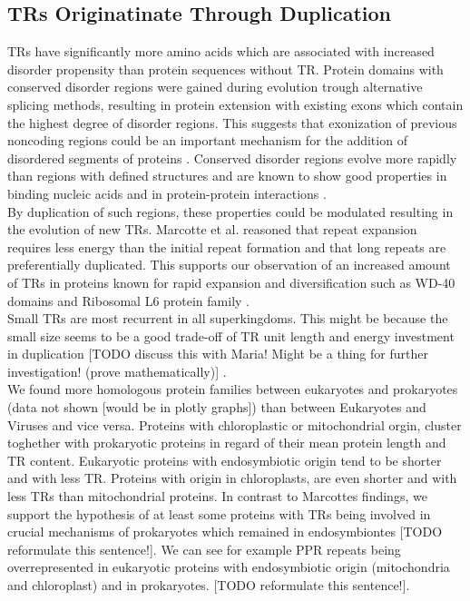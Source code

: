 \documentclass[a4,center,fleqn]{NAR}
\begin{document}
\subsection{TRs Originatinate Through Duplication}
TRs have significantly more amino acids which are associated with increased disorder propensity than protein sequences without TR. 
Protein domains with conserved disorder regions were gained during evolution trough alternative splicing methods, resulting in protein extension with existing exons which contain the highest degree of disorder regions. This suggests that exonization of previous noncoding regions could be an important mechanism for the addition of disordered segments of proteins \cite{Krisentseva2003, Romero2006, Hegyi2011, Buljan2012, Barbosa2012}.
Conserved disorder regions evolve more rapidly than regions with defined structures and are known to show good properties in binding nucleic acids and in protein-protein interactions \cite{Chen2006}. \\
By duplication of such regions, these properties could be modulated resulting in the evolution of new TRs.
Marcotte et al. reasoned that repeat expansion requires less energy than the initial repeat formation and that long repeats are preferentially duplicated. 
This supports our observation of an increased amount of TRs in proteins known for rapid expansion and diversification such as WD-40 domains and Ribosomal L6 protein family \cite{Smith1999, Golden1993}.\\
Small TRs are most recurrent in all superkingdoms. This might be because the small size seems to be a good trade-off of TR unit length and energy investment in duplication [TODO discuss this with Maria! Might be a thing for further investigation! (prove mathematically)] \cite{Andrade2001}.\\
We found more homologous protein families between eukaryotes and prokaryotes (data not shown [would be in plotly graphs]) than between Eukaryotes and Viruses and vice versa. 
Proteins with chloroplastic or mitochondrial orgin, cluster toghether with prokaryotic proteins in regard of their mean protein length and TR content. 
Eukaryotic proteins with endosymbiotic origin tend to be shorter and with less TR. Proteins with origin in chloroplasts, are even shorter and with less TRs than mitochondrial proteins. In contrast to Marcottes \cite{Marcotte1999} findings, we support the hypothesis of at least some proteins with TRs being involved in crucial mechanisms of prokaryotes which remained in endosymbiontes [TODO reformulate this sentence!]. We can see for example PPR repeats being overrepresented in eukaryotic proteins with endosymbiotic origin (mitochondria and chloroplast) and in prokaryotes. [TODO reformulate this sentence!].
\end{document}
